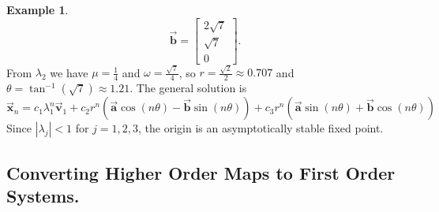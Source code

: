 \documentclass[reqno]{immbook}
\newcommand{\BA}{\vec{\textbf{a}}}
\newcommand{\BB}{\vec{\textbf{b}}}
\newcommand{\BV}{\vec{\textbf{v}}}
\newcommand{\BX}{\vec{\textbf{x}}}
\numberwithin{equation}{chapter}
\numberwithin{question}{section}
\numberwithin{theorem}{chapter}
\numberwithin{figure}{chapter}
\theoremstyle{definition}
\newtheorem{example}{Example}[section]
\begin{document}
\begin{example}
\begin{equation}
    \BB = \begin{bmatrix} 2\sqrt{7} \\ \sqrt{7} \\ 0\end{bmatrix}.
\end{equation}
From $\lambda_2$ we have $\mu = \frac{1}{4}$ and
$\omega = \frac{\sqrt{7}}{4}$, so
$r = \frac{\sqrt{2}}{2} \approx 0.707$ and $\theta = \tan^{-1}(\sqrt{7}) \approx 1.21$.
The general solution is
\begin{equation}
  \BX_n = c_1 \lambda_1^n \BV_1 +
          c_2 r^n\left(\BA\cos(n\theta) - \BB\sin(n\theta)\right) +
          c_3 r^n\left(\BA\sin(n\theta) + \BB\cos(n\theta)\right) 
\end{equation}
Since $|\lambda_j| < 1$ for $j=1,2,3$, the origin is an
asymptotically stable fixed point.
\end{example}


\subsection*{Converting Higher Order Maps to First Order Systems.}
\end{document}
